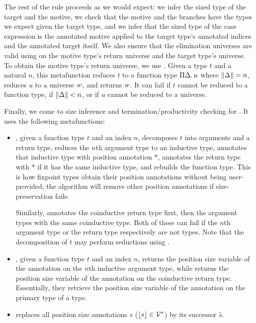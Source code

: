 The rest of the rule proceeds as we would expect: we infer the sized type of the target and the motive, we check that the motive and the branches have the types we expect given the target type, and we infer that the sized type of the case expression is the annotated motive applied to the target type's annotated indices and the annotated target itself.
We also ensure that the elimination universes are valid using \elim on the motive type's return universe and the target type's universe.
To obtain the motive type's return universe, we use \decompose.
Given a type $t$ and a natural $n$, this metafunction reduces $t$ to a function type $\Pi \Delta \mathpunct{.} u$ where $\lVert\Delta\rVert = n$, reduces $u$ to a universe $w$, and returns $w$.
It can fail if $t$ cannot be reduced to a function type, if $\lVert\Delta\rVert < n$, or if $u$ cannot be reduced to a universe.

Finally, we come to size inference and termination/productivity checking for \cofixpoints.
It uses the following metafunctions:
\begin{itemize}
  \item \setrecstars, given a function type $t$ and an index $n$, decomposes $t$ into arguments and a return type, reduces the $n$th argument type to an inductive type, annotates that inductive type with position annotation $*$, annotates the return type with $*$ if it has the same inductive type, and rebuilds the function type.
    This is how fixpoint types obtain their position annotations without being user-provided; the algorithm will remove other position annotations if size-preservation fails.
    
    Similarly, \setcorecstars annotates the coinductive return type first, then the argument types with the same coinductive type.
    Both of these can fail if the $n$th argument type or the return type respectively are not \coinductive types.
    Note that the decomposition of $t$ may perform reductions using \whnf.
  \item \getrecvar, given a function type $t$ and an index $n$, returns the position size variable of the annotation on the $n$th inductive argument type, while \getcorecvar returns the position size variable of the annotation on the coinductive return type.
    Essentially, they retrieve the position size variable of the annotation on the primary \corecursive type of a \cofixpoint type.
  \item \shift replaces all position size annotations $s$ (\ie $\lfloor s\rfloor \in \mathcal{V}^*$) by its successor $\hat{s}$.
\end{itemize}

